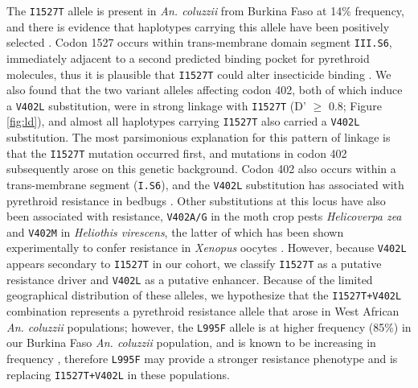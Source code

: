 \documentclass[a4paper,11pt,abstracton,hidelinks]{scrartcl}
\begin{document}
%
The \texttt{I1527T} allele is present in \textit{An. coluzzii} from Burkina Faso at 14\% frequency, and there is evidence that haplotypes carrying this allele have been positively selected \cite{Ag1000gConsortium2017}.
%
Codon 1527 occurs within trans-membrane domain segment \texttt{III.S6}, immediately adjacent to a second predicted binding pocket for pyrethroid molecules, thus it is plausible that \texttt{I1527T} could alter insecticide binding \cite{Dong2014}.
%
We also found that the two variant alleles affecting codon 402, both of which induce a \texttt{V402L} substitution, were in strong linkage with \texttt{I1527T} (D' $\geq$ 0.8; Figure \ref{fig:ld}), and almost all haplotypes carrying \texttt{I1527T} also carried a \texttt{V402L} substitution.
%
The most parsimonious explanation for this pattern of linkage is that the \texttt{I1527T} mutation occurred first, and mutations in codon 402 subsequently arose on this genetic background.
%
Codon 402 also occurs within a trans-membrane segment (\texttt{I.S6}), and the \texttt{V402L} substitution has associated with pyrethroid resistance in bedbugs \cite{Yoon2008}.
%
Other substitutions at this locus have also been associated with resistance, \texttt{V402A/G} in the moth crop pests \emph{Helicoverpa zea} \cite{Hopkins2010} and \texttt{V402M} in \emph{Heliothis virescens}, the latter of which has been shown experimentally to confer resistance in \textit{Xenopus} oocytes \cite{Park1997, Lee2013}.
%
However, because \texttt{V402L} appears secondary to \texttt{I1527T} in our cohort, we classify \texttt{I1527T} as a putative resistance driver and \texttt{V402L} as a putative enhancer.
%
Because of the limited geographical distribution of these alleles, we hypothesize that the \texttt{I1527T+V402L} combination represents a pyrethroid resistance allele that arose in West African \textit{An. coluzzii} populations; however, the \texttt{L995F} allele is at higher frequency (85\%) in our Burkina Faso \textit{An. coluzzii} population, and is known to be increasing in frequency \cite{Toe2014}, therefore \texttt{L995F} may provide a stronger resistance phenotype and is replacing \texttt{I1527T+V402L} in these populations.
\end{document}
